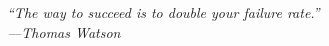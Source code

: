 
\begin{epigraph}
%
\vspace*{\fill}
\begin{center}
\textit{``The way to succeed is to double your failure rate.''
\\
---Thomas Watson}
\\
\end{center}
\vspace*{\fill}
\end{epigraph}